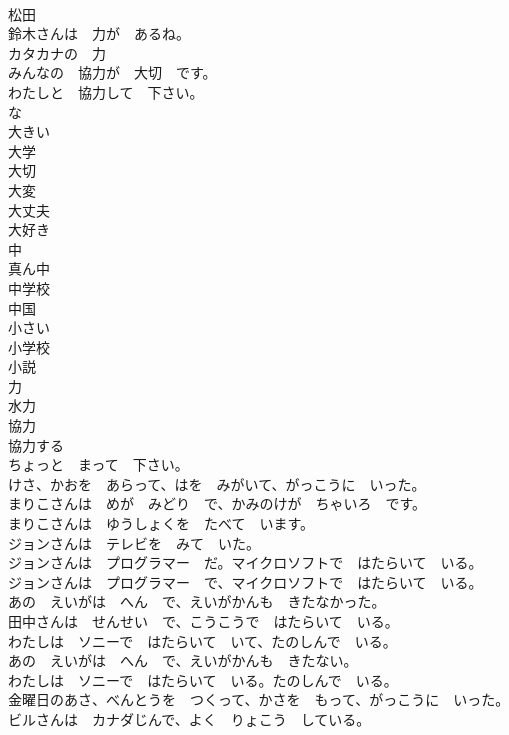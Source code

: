 \documentclass[8pt]{extreport}
\begin{document}
\begin{CJK}{UTF8}{min}
\\	松田	
\\	鈴木さんは　力が　あるね。	
\\	カタカナの　力	
\\	みんなの　協力が　大切　です。	
\\	わたしと　協力して　下さい。	
\\	な	
\\	大きい	
\\	大学	
\\	大切	
\\	大変	
\\	大丈夫	
\\	大好き	
\\	中	
\\	真ん中	
\\	中学校	
\\	中国	
\\	小さい	
\\	小学校	
\\	小説	
\\	力	
\\	水力	
\\	協力	
\\	協力する	
\\	ちょっと　まって　下さい。	
\\	けさ、かおを　あらって、はを　みがいて、がっこうに　いった。	
\\	まりこさんは　めが　みどり　で、かみのけが　ちゃいろ　です。	
\\	まりこさんは　ゆうしょくを　たべて　います。	
\\	ジョンさんは　テレビを　みて　いた。	
\\	ジョンさんは　プログラマー　だ。マイクロソフトで　はたらいて　いる。	
\\	ジョンさんは　プログラマー　で、マイクロソフトで　はたらいて　いる。	
\\	あの　えいがは　へん　で、えいがかんも　きたなかった。	
\\	田中さんは　せんせい　で、こうこうで　はたらいて　いる。	
\\	わたしは　ソニーで　はたらいて　いて、たのしんで　いる。	
\\	あの　えいがは　へん　で、えいがかんも　きたない。	
\\	わたしは　ソニーで　はたらいて　いる。たのしんで　いる。	
\\	金曜日のあさ、べんとうを　つくって、かさを　もって、がっこうに　いった。	
\\	ビルさんは　カナダじんで、よく　りょこう　している。	

\end{CJK}
\end{document}
